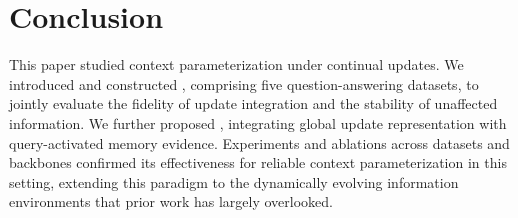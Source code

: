 \section{Conclusion}
\label{sec:conclusion}
This paper studied context parameterization under continual updates. We introduced \task{} and constructed \benchmark{}, comprising five question-answering datasets, to jointly evaluate the fidelity of update integration and the stability of unaffected information. We further proposed \method{}, integrating global update representation with query-activated memory evidence. Experiments and ablations across datasets and backbones confirmed its effectiveness for reliable context parameterization in this setting, extending this paradigm to the dynamically evolving information environments that prior work has largely overlooked.
